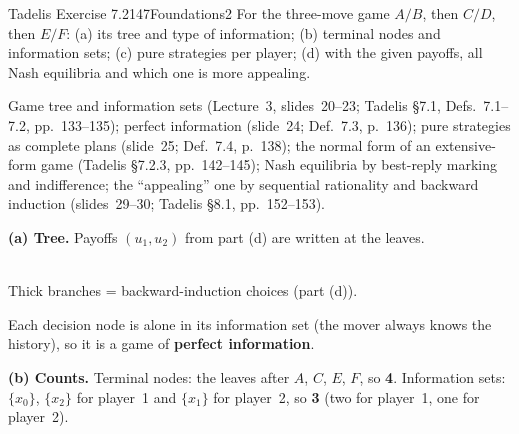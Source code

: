 \begin{exsol}{Tadelis Exercise 7.2}{147}{Foundations}{2}
\asked For the three-move game $A/B$, then $C/D$, then $E/F$: (a) its tree and type of
information; (b) terminal nodes and information sets; (c) pure strategies per player; (d) with
the given payoffs, all Nash equilibria and which one is more appealing.

\method Game tree and information sets (Lecture~3, slides~20--23; Tadelis \S7.1, Defs.~7.1--7.2,
pp.~133--135); perfect information (slide~24; Def.~7.3, p.~136); pure strategies as complete plans
(slide~25; Def.~7.4, p.~138); the normal form of an extensive-form game (Tadelis \S7.2.3,
pp.~142--145); Nash equilibria by best-reply marking and indifference; the ``appealing'' one by
sequential rationality and backward induction (slides~29--30; Tadelis \S8.1, pp.~152--153).

\solution
\textbf{(a) Tree.} Payoffs $(u_1,u_2)$ from part (d) are written at the leaves.
\begin{center}
\\[2pt]
{\footnotesize Thick branches = backward-induction choices (part (d)).}
\end{center}
Each decision node is alone in its information set (the mover always knows the history), so it is
a game of \textbf{perfect information}.

\textbf{(b) Counts.} Terminal nodes: the leaves after $A$, $C$, $E$, $F$, so \textbf{4}.
Information sets: $\{x_0\}$, $\{x_2\}$ for player~1 and $\{x_1\}$ for player~2, so \textbf{3}
(two for player~1, one for player~2).


\end{exsol}
